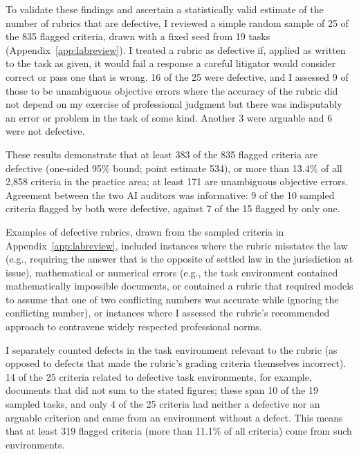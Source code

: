 \documentclass[11pt]{article}
\newcommand{\labCriteria}{2{,}858}
\newcommand{\labFlagged}{835}
\newcommand{\labSample}{25}
\newcommand{\labSampleTasks}{19}
\newcommand{\labDefective}{16}
\newcommand{\labArguable}{3}
\newcommand{\labNotDefective}{6}
\newcommand{\labObjective}{9}
\newcommand{\labEnvItems}{14}
\newcommand{\labEnvTasks}{10}
\newcommand{\labNoDefect}{4}
\newcommand{\labBothFlagged}{10}
\newcommand{\labBothDefective}{9}
\newcommand{\labSingleFlagged}{15}
\newcommand{\labSingleDefective}{7}
\newcommand{\labDefectiveLB}{383}
\newcommand{\labDefectivePoint}{534}
\newcommand{\labDefectiveShare}{13.4}
\newcommand{\labObjectiveLB}{171}
\newcommand{\labEnvLB}{319}
\newcommand{\labEnvShare}{11.1}
\begin{document}
To validate these findings and ascertain a statistically valid estimate of the number of rubrics that are defective, I reviewed a simple random sample of \labSample{} of the \labFlagged{} flagged criteria, drawn with a fixed seed from \labSampleTasks{} tasks (Appendix~\ref{app:labreview}). I treated a rubric as defective if, applied as written to the task as given, it would fail a response a careful litigator would consider correct or pass one that is wrong. \labDefective{} of the \labSample{} were defective, and I assessed \labObjective{} of those to be unambiguous objective errors where the accuracy of the rubric did not depend on my exercise of professional judgment but there was indisputably an error or problem in the task of some kind. Another \labArguable{} were arguable and \labNotDefective{} were not defective.

These results demonstrate that at least \labDefectiveLB{} of the \labFlagged{} flagged criteria are defective (one-sided 95\% bound; point estimate \labDefectivePoint{}), or more than \labDefectiveShare\% of all \labCriteria{} criteria in the practice area; at least \labObjectiveLB{} are unambiguous objective errors. Agreement between the two AI auditors was informative: \labBothDefective{} of the \labBothFlagged{} sampled criteria flagged by both were defective, against \labSingleDefective{} of the \labSingleFlagged{} flagged by only one.

Examples of defective rubrics, drawn from the sampled criteria in Appendix~\ref{app:labreview}, included instances where the rubric misstates the law (e.g., requiring the answer that is the opposite of settled law in the jurisdiction at issue), mathematical or numerical errors (e.g., the task environment contained mathematically impossible documents, or contained a rubric that required models to assume that one of two conflicting numbers was accurate while ignoring the conflicting number), or instances where I assessed the rubric's recommended approach to contravene widely respected professional norms.


I separately counted defects in the task environment relevant to the rubric (as opposed to defects that made the rubric's grading criteria themselves incorrect). \labEnvItems{} of the \labSample{} criteria related to defective task environments, for example, documents that did not sum to the stated figures; these span \labEnvTasks{} of the \labSampleTasks{} sampled tasks, and only \labNoDefect{} of the \labSample{} criteria had neither a defective nor an arguable criterion and came from an environment without a defect. This means that at least \labEnvLB{} flagged criteria (more than \labEnvShare\% of all criteria) come from such environments.
\end{document}
